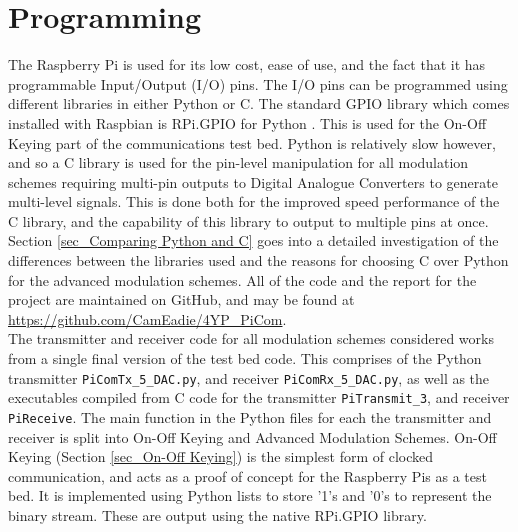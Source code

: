 \documentclass[../main.tex]{subfiles}
\begin{document}
\clearpage


\section{Programming}

The Raspberry Pi is used for its low cost, ease of use, and the fact that it has programmable Input/Output (I/O) pins.
The I/O pins can be programmed using different libraries in either Python or C.
The standard GPIO library which comes installed with Raspbian is RPi.GPIO for Python \cite{lib_RPi.GPIO}.
This is used for the On-Off Keying part of the communications test bed.
Python is relatively slow however, and so a C library is used for the pin-level manipulation for all modulation schemes requiring multi-pin outputs to Digital Analogue Converters to generate multi-level signals.
This is done both for the improved speed performance of the C library, and the capability of this library to output to multiple pins at once.
Section \ref{sec_Comparing Python and C} goes into a detailed  investigation of the differences between the libraries used and the reasons for choosing C over Python for the advanced modulation schemes.
All of the code and the report for the project are maintained on GitHub, and may be found at \url{https://github.com/CamEadie/4YP_PiCom}.\\

The transmitter and receiver code for all modulation schemes considered works from a single final version of the test bed code.
This comprises of the Python transmitter \colorbox{backcolour}{\lstinline{PiComTx_5_DAC.py}}, and receiver \colorbox{backcolour}{\lstinline{PiComRx_5_DAC.py}}, as well as the executables compiled from C code for the transmitter \colorbox{backcolour}{\lstinline{PiTransmit_3}}, and receiver \colorbox{backcolour}{\lstinline{PiReceive}}.
The main function in the Python files for each the transmitter and receiver is split into On-Off Keying and Advanced Modulation Schemes.
On-Off Keying (Section \ref{sec_On-Off Keying}) is the simplest form of clocked communication, and acts as a proof of concept for the Raspberry Pis as a test bed.
It is implemented using Python lists to store '1's and '0's to represent the binary stream.
These are output using the native RPi.GPIO library.\\
\end{document}
